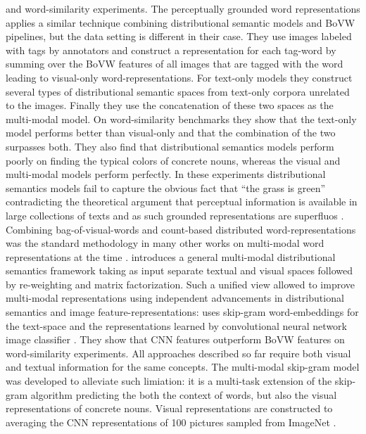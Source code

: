 and word-similarity experiments. The perceptually grounded word representations \cite{bruni2012distributional} applies
a similar technique combining distributional semantic models and BoVW pipelines, but the data setting is
different in their case. They use images labeled with tags by annotators and construct a representation for each tag-word
by summing over the BoVW features of all images that are tagged with the word leading to visual-only
word-representations. For text-only models they construct several types of distributional semantic spaces from text-only
corpora unrelated to the images. Finally they use the concatenation of these two spaces as the multi-modal model.
On word-similarity benchmarks they show that the text-only model performs better than visual-only and that the combination
of the two surpasses both. They also find that distributional semantics models perform poorly on finding the typical
colors of concrete nouns, whereas the visual and multi-modal models perform perfectly. In these experiments
distributional semantics models fail to capture the obvious fact that ``the grass is green''
contradicting the theoretical argument that perceptual information is available in large collections of texts
and as such grounded representations are superfluos \cite{louwerse2011symbol}.
Combining bag-of-visual-words and count-based distributed word-representations was the standard methodology
in many other works on multi-modal word representations at the time \cite{bruni2011distributional,leong2011going,leong2011measuring}.
\cite{bruni2014multimodal} introduces a general multi-modal distributional semantics framework taking as input
separate textual and visual spaces followed by re-weighting and matrix factorization. Such a unified view allowed
to improve multi-modal representations using independent advancements in distributional semantics and image
feature-representations: \cite{kiela2014learning} uses skip-gram word-embeddings for the text-space
and the representations learned by convolutional neural network image classifier \cite{oquab2014learning}.
They show that CNN features outperform BoVW features on word-similarity experiments.
All approaches described so far require both visual and textual information for the same concepts.
The multi-modal skip-gram \cite{lazaridou2015combining} model was developed to alleviate such limiation:
it is a multi-task extension of the skip-gram algorithm predicting the both the context of words, but also
the visual representations of concrete nouns. Visual representations are constructed to averaging
the CNN representations \cite{krizhevsky2012imagenet} of 100 pictures sampled from ImageNet \cite{deng2009imagenet}.
